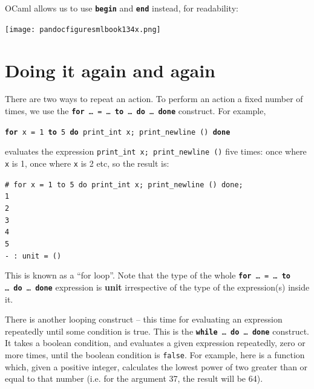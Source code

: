 \documentclass[]{book}
\newcommand{\pdone}{\textbf{done}\xspace}
\newcommand{\smspace}{\vspace{4mm}}
\begin{document}
\noindent OCaml allows us to use \textbf{\texttt{begin}} and \textbf{\texttt{end}} instead, for readability:

\medskip
\begin{center}
\noindent\texttt{[image: pandocfiguresmlbook134x.png]}
\end{center}
\medskip

\section*{Doing it again and again}

There are two ways to repeat an action. To perform an action a fixed number of times, we use the \textbf{\texttt{for}}\texttt{ \ldots\ = \ldots\ }\textbf{\texttt{to}}\texttt{ \ldots\ }\textbf{\texttt{do}}\texttt{ \ldots\ }\textbf{\texttt{done}} construct. For example,  

\smspace
  \textbf{\texttt{for}}\texttt{ x = 1 }\textbf{\texttt{to}}\texttt{ 5 }\textbf{\texttt{do}}\texttt{ print\_int x; print\_newline () }\textbf{\texttt{\pdone}}
\smspace

\noindent evaluates the expression \texttt{print\_int x; print\_newline ()} five times: once where \texttt{x} is 1, once where \texttt{x} is 2 etc, so the result is:

\smspace
\noindent\verb$# for x = 1 to 5 do print_int x; print_newline () done;$\\
\noindent\verb!1!\\
\noindent\verb!2!\\
\noindent\verb!3!\\
\noindent\verb!4!\\
\noindent\verb!5!\\
\noindent\verb!- : unit = ()!
\smspace

\noindent This is known as a ``for loop''. Note that the type of the whole \textbf{\texttt{for}}\texttt{ \ldots\ = \ldots\ }\textbf{\texttt{to}}\texttt{ \ldots\ }\textbf{\texttt{do}}\texttt{ \ldots\ }\textbf{\texttt{done}} expression is \textbf{\textsf{unit}} irrespective of the type of the expression(s) inside it.

There is another looping construct -- this time for evaluating an expression repeatedly until some condition is true. This is the \textbf{\texttt{while}}\texttt{ \ldots\ }\textbf{\texttt{do}}\texttt{ \ldots\ }\textbf{\texttt{done}} construct. It takes a boolean condition, and evaluates a given expression repeatedly, zero or more times, until the boolean condition is \texttt{false}. For example, here is a function which, given a positive integer, calculates the lowest power of two greater than or equal to that number (i.e. for the argument 37, the result will be 64).
\end{document}
